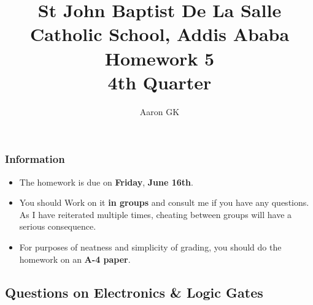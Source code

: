 \documentclass[11pt,addpoints]{exam}
\author{Aaron GK}
\begin{document}
	\title{St John Baptist De La Salle Catholic School, Addis Ababa\\
		\large Homework 5 \\
		4th Quarter}
	\maketitle
	\begin{center}
		\subsubsection*{Information}
		\begin{itemize}
			\item The homework is due on \textbf{Friday}, \textbf{June 16th}.
			\item You should Work on it \textbf{in groups} and consult me if you have any questions. As I have reiterated multiple times, cheating between groups will have a serious consequence.
			\item For purposes of neatness and simplicity of grading, you should do the homework on an \textbf{A-4 paper}.
		\end{itemize}
	\end{center}
	\begin{center}
		\subsection*{Questions on Electronics \& Logic Gates}
	\end{center}
	
\end{document}
